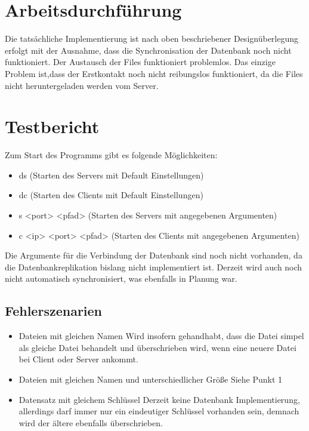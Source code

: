 \documentclass[a4paper,12pt]{scrreprt}
\begin{document}
\chapter{Arbeitsdurchführung}
Die tatsächliche Implementierung ist nach oben beschriebener Designüberlegung erfolgt mit der Ausnahme, dass die Synchronisation der Datenbank noch nicht funktioniert. Der Austausch der Files funktioniert problemlos. Das einzige Problem ist,dass der Erstkontakt noch nicht reibungslos funktioniert, da die Files nicht heruntergeladen werden vom Server.
\chapter{Testbericht}
Zum Start des Programms gibt es folgende Möglichkeiten:
\begin{itemize}
\item ds (Starten des Servers mit Default Einstellungen)
\item dc (Starten des Clients mit Default Einstellungen)
\item s <port> <pfad> (Starten des Servers mit angegebenen Argumenten)
\item c <ip> <port> <pfad> (Starten des Clients mit angegebenen Argumenten)
\end{itemize}
Die Argumente für die Verbindung der Datenbank sind noch nicht vorhanden, da die Datenbankreplikation bislang nicht implementiert ist. Derzeit wird auch noch nicht automatisch synchronisiert, was ebenfalls in Planung war.
\section{Fehlerszenarien}
\begin{itemize}
\item Dateien mit gleichen Namen
\subitem Wird insofern gehandhabt, dass die Datei simpel als gleiche Datei behandelt und überschrieben wird, wenn eine neuere Datei bei Client oder Server ankommt.
\item Dateien mit gleichen Namen und unterschiedlicher Größe
\subitem Siehe Punkt 1
\item Datensatz mit gleichem Schlüssel
\subitem Derzeit keine Datenbank Implementierung, allerdings darf immer nur ein eindeutiger Schlüssel vorhanden sein, demnach wird der ältere ebenfalls überschrieben. 
\end{itemize}
 
 
\end{document}
